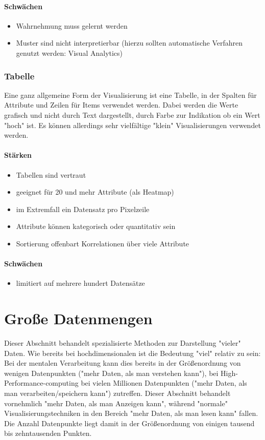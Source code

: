 				\paragraph{Schwächen}
				\begin{itemize}
					\item Wahrnehmung muss gelernt werden
					\item Muster sind nicht interpretierbar (hierzu sollten automatische Verfahren genutzt werden: Visual Analytics)
				\end{itemize}

			\subsubsection{Tabelle}
				Eine ganz allgemeine Form der Visualisierung ist eine Tabelle, in der Spalten für Attribute und Zeilen für Items verwendet werden. Dabei werden die Werte grafisch und nicht durch Text dargestellt, \bspw durch Farbe zur Indikation ob ein Wert "hoch" ist. Es können allerdings sehr vielfältige "klein" Visualisierungen verwendet werden.

				\paragraph{Stärken}
				\begin{itemize}
					\item Tabellen sind vertraut
					\item geeignet für 20 und mehr Attribute (als Heatmap)
					\item im Extremfall ein Datensatz pro Pixelzeile
					\item Attribute können kategorisch oder quantitativ sein
					\item Sortierung offenbart Korrelationen über viele Attribute
				\end{itemize}

				\paragraph{Schwächen}
				\begin{itemize}
					\item limitiert auf mehrere hundert Datensätze
				\end{itemize}

	\section{Große Datenmengen}
		Dieser Abschnitt behandelt spezialisierte Methoden zur Darstellung "vieler" Daten. Wie bereits bei hochdimensionalen ist die Bedeutung "viel" relativ zu sein: Bei der mentalen Verarbeitung kann dies bereits in der Größenordnung von wenigen Datenpunkten ("mehr Daten, als man verstehen kann"), bei High-Performance-computing bei vielen Millionen Datenpunkten ("mehr Daten, als man verarbeiten/speichern kann") zutreffen. Dieser Abschnitt behandelt vornehmlich "mehr Daten, als man Anzeigen kann", während "normale" Visualisierungstechniken in den Bereich "mehr Daten, als man lesen kann" fallen. Die Anzahl Datenpunkte liegt damit in der Größenordnung von einigen tausend bis zehntausenden Punkten.

